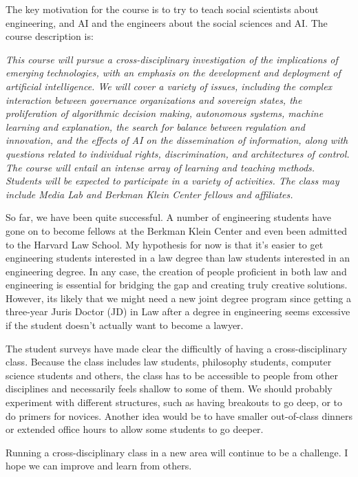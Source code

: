 The key motivation for the course is to try to teach social scientists about engineering, and \ac{AI} and the engineers about the social sciences and \ac{AI}. The course description is:

\textit{This course will pursue a cross-disciplinary investigation of the implications of emerging technologies, with an emphasis on the development and deployment of artificial intelligence. We will cover a variety of issues, including the complex interaction between governance organizations and sovereign states, the proliferation of algorithmic decision making, autonomous systems, machine learning and explanation, the search for balance between regulation and innovation, and the effects of \ac{AI} on the dissemination of information, along with questions related to individual rights, discrimination, and architectures of control. The course will entail an intense array of learning and teaching methods. Students will be expected to participate in a variety of activities. The class may include Media Lab and Berkman Klein Center fellows and affiliates.}

So far, we have been quite successful. A number of engineering students have gone on to become fellows at the Berkman Klein Center and even been admitted to the Harvard Law School. My hypothesis for now is that it's easier to get engineering students interested in a law degree than law students interested in an engineering degree. In any case, the creation of people proficient in both law and engineering is essential for bridging the gap and creating truly creative solutions. However, its likely that we might need a new joint degree program since getting a three-year Juris Doctor (JD) in Law after a degree in engineering seems excessive if the student doesn't actually want to become a lawyer.

The student surveys have made clear the difficultly of having a cross-disciplinary class. Because the class includes law students, philosophy students, computer science students and others, the class has to be accessible to people from other disciplines and necessarily feels shallow to some of them. We should probably experiment with different structures, such as having breakouts to go deep, or to do primers for novices. Another idea would be to have smaller out-of-class dinners or extended office hours to allow some students to go deeper.

Running a cross-disciplinary class in a new area will continue to be a challenge. I hope  we can improve and learn from others.

